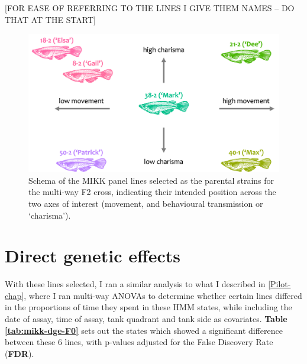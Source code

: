 \documentclass[
]{book}
\begin{document}
{[}FOR EASE OF REFERRING TO THE LINES I GIVE THEM NAMES -- DO THAT AT THE START{]}

\begin{figure}
\includegraphics[width=1\linewidth]{figs/mikk_behaviour/line_selection_schema} \caption{Schema of the MIKK panel lines selected as the parental strains for the multi-way F2 cross, indicating their intended position across the two axes of interest (movement, and behavioural transmission or `charisma').}\label{fig:F0-line-select-schema}
\end{figure}

\clearpage

\hypertarget{direct-genetic-effects}{%
\section{Direct genetic effects}\label{direct-genetic-effects}}

With these lines selected, I ran a similar analysis to what I described in \ref{Pilot-chap}, where I ran multi-way ANOVAs to determine whether certain lines differed in the proportions of time they spent in these HMM states, while including the date of assay, time of assay, tank quadrant and tank side as covariates. \textbf{Table \ref{tab:mikk-dge-F0}} sets out the states which showed a significant difference between these 6 lines, with p-values adjusted for the False Discovery Rate (\textbf{FDR}).
\end{document}
